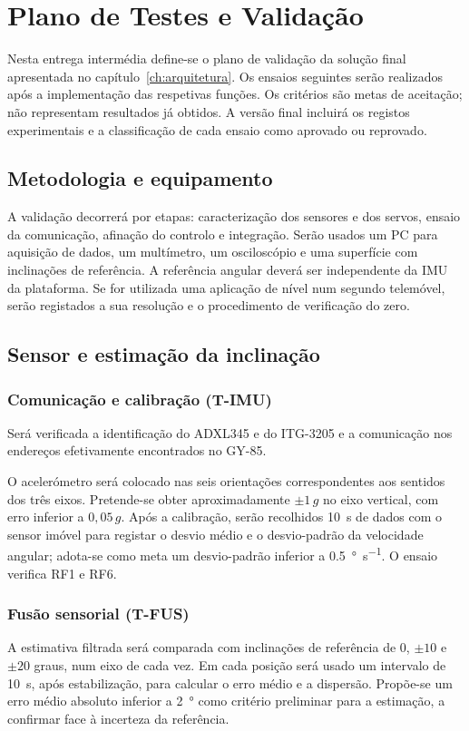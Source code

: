 \chapter{Plano de Testes e Validação}
\label{ch:testes}

Nesta entrega intermédia define-se o plano de validação da solução final apresentada no capítulo~\ref{ch:arquitetura}. Os ensaios seguintes serão realizados após a implementação das respetivas funções. Os critérios são metas de aceitação; não representam resultados já obtidos. A versão final incluirá os registos experimentais e a classificação de cada ensaio como aprovado ou reprovado.

\section{Metodologia e equipamento}
A validação decorrerá por etapas: caracterização dos sensores e dos servos, ensaio da comunicação, afinação do controlo e integração. Serão usados um PC para aquisição de dados, um multímetro, um osciloscópio e uma superfície com inclinações de referência. A referência angular deverá ser independente da IMU da plataforma. Se for utilizada uma aplicação de nível num segundo telemóvel, serão registados a sua resolução e o procedimento de verificação do zero.

\section{Sensor e estimação da inclinação}
\subsection{Comunicação e calibração (T-IMU)}
Será verificada a identificação do ADXL345 e do ITG-3205 e a comunicação nos endereços efetivamente encontrados no GY-85. 

O acelerómetro será colocado nas seis orientações correspondentes aos sentidos dos três eixos. Pretende-se obter aproximadamente $\pm1\,g$ no eixo vertical, com erro inferior a $0{,}05\,g$. Após a calibração, serão recolhidos \SI{10}{\second} de dados com o sensor imóvel para registar o desvio médio e o desvio-padrão da velocidade angular; adota-se como meta um desvio-padrão inferior a \SI{0.5}{\degree\per\second}. O ensaio verifica RF1 e RF6.

\subsection{Fusão sensorial (T-FUS)}
A estimativa filtrada será comparada com inclinações de referência de $0$, $\pm10$ e $\pm20$ graus, num eixo de cada vez. Em cada posição será usado um intervalo de \SI{10}{\second}, após estabilização, para calcular o erro médio e a dispersão. Propõe-se um erro médio absoluto inferior a \SI{2}{\degree} como critério preliminar para a estimação, a confirmar face à incerteza da referência.

